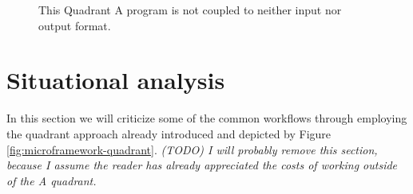 \documentclass{scrreprt}
\begin{document}
\begin{figure}[p]
  \centering


  \caption{This Quadrant A program is not coupled to neither input nor output format.}
  \label{fig:workflows-framework-gen-in-gen-out}
\end{figure}







\section{Situational analysis}
In this section we will criticize some of the common workflows through employing the quadrant approach already introduced and depicted by Figure \ref{fig:microframework-quadrant}. \emph{(TODO) I will probably remove this section, because I assume the reader has already appreciated the costs of working outside of the A quadrant.}


\end{document}
